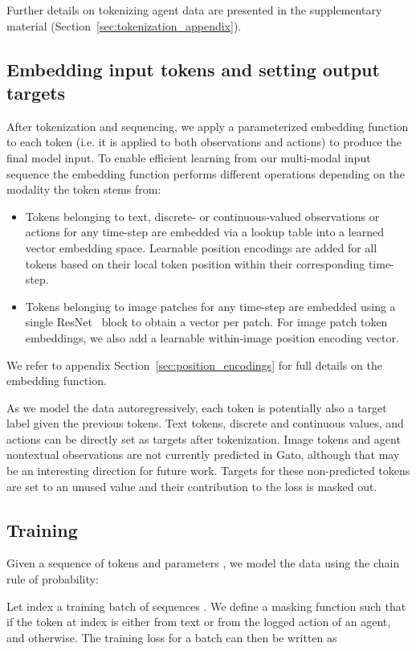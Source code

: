 \documentclass[10pt]{article} \usepackage[accepted]{tmlr}
\newcommand{\model}{{Gato}}
\begin{document}
\noindent Further details on tokenizing agent data are presented in the supplementary material (Section~\ref{sec:tokenization_appendix}).
\vskip 0.4cm
\subsection{Embedding input tokens and setting output targets}
\label{sec:embed}
\vskip 0.2cm
After tokenization and sequencing, we apply a parameterized embedding function  to each token (i.e. it is applied to both observations and actions) to produce the final model input.
To enable efficient learning from our multi-modal input sequence  the embedding function performs different operations depending on the modality the token stems from:



\begin{itemize}
\item Tokens belonging to text, discrete- or continuous-valued observations or actions for any time-step are embedded via a lookup table into a learned vector embedding space. Learnable position encodings are added for all tokens based on their local token position within their corresponding time-step. 
\item Tokens belonging to image patches for any time-step are embedded using a single ResNet~\citep{he2016deep} block to obtain a vector per patch. For image patch token embeddings, we also add a learnable within-image position encoding vector.
\end{itemize}
We refer to appendix Section~\ref{sec:position_encodings} for full details on the embedding function.

As we model the data autoregressively, each token is potentially also a target label given the previous tokens.
Text tokens, discrete and continuous values, and actions can be directly set as targets after tokenization.
Image tokens and agent nontextual observations are not currently predicted in \model{}, although that may be an interesting direction for future work.
Targets for these non-predicted tokens are set to an unused value and their contribution to the loss is masked out.
\vskip 0.4cm
\subsection{Training}
\vskip 0.2cm
Given a sequence of tokens  and parameters , we model the data using the chain rule of probability:

Let  index a training batch of sequences .
We define a masking function  such that  if the token at index  is either from text or from the logged action of an agent, and  otherwise.
The training loss for a batch  can then be written as
\end{document}
